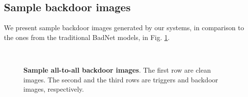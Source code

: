 \subsection{Sample backdoor images}
We present sample backdoor images generated by our systems, in comparison to the ones from the traditional BadNet models, in Fig. \ref{fig:all2all_sample}.
\begin{figure}[t]
\centering
{}
\hspace{2mm}
\\
\vskip 0.05in

    \vspace{-1mm}
\caption{{\bfseries Sample all-to-all backdoor images}. The first row are clean images. The second and the third rows are triggers and backdoor images, respectively.}
    \vspace{-4mm}
\label{fig:all2all_sample}
\end{figure}

